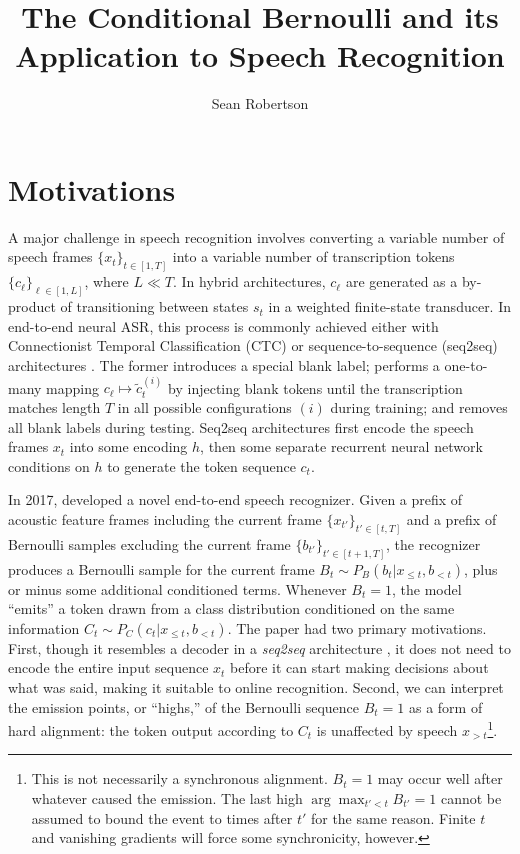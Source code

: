\documentclass{article}
\title{The Conditional Bernoulli and its Application to Speech Recognition}
\author{Sean Robertson}
\begin{document}
\maketitle

\section{Motivations} \label{sec:motivations}

A major challenge in speech recognition involves converting a variable number
of speech frames $\{x_t\}_{t \in [1, T]}$ into a variable number of
transcription tokens $\{c_\ell\}_{\ell \in [1, L]}$, where $L \ll T$. In hybrid
architectures, $c_\ell$ are generated as a by-product of transitioning between
states $s_t$ in a weighted finite-state transducer. In end-to-end neural ASR,
this process is commonly achieved either with Connectionist Temporal
Classification (CTC) \cite{gravesConnectionistTemporalClassification2006} or
sequence-to-sequence (seq2seq) architectures
\cite{bahdanauNeuralMachineTranslation2015}. The former introduces a special
blank label; performs a one-to-many mapping $c_\ell \mapsto \tilde{c}_t^{(i)}$
by injecting blank tokens until the transcription matches length $T$ in all
possible configurations $(i)$ during training; and removes all blank labels
during testing. Seq2seq architectures first encode the speech frames $x_t$ into
some encoding $h$, then some separate recurrent neural network conditions on
$h$ to generate the token sequence $c_t$.

In 2017, \citeauthor{luoLearningOnlineAlignments2017} developed a novel
end-to-end speech recognizer. Given a prefix of acoustic feature frames
including the current frame $\{x_{t'}\}_{t' \in [t, T]}$ and a prefix of
Bernoulli samples excluding the current frame $\{b_{t'}\}_{t' \in [t+1,T]}$,
the recognizer produces a Bernoulli sample for the current frame $B_t \sim
P_B(b_t|x_{\leq t}, b_{<t})$, plus or minus some additional conditioned terms.
Whenever $B_t = 1$, the model ``emits'' a token drawn from a class distribution
conditioned on the same information $C_t \sim P_C(c_t|x_{\leq t}, b_{<t})$. The
paper had two primary motivations. First, though it resembles a decoder in a
\textit{seq2seq} architecture \cite{bahdanauNeuralMachineTranslation2015}, it
does not need to encode the entire input sequence $x_t$ before it can start
making decisions about what was said, making it suitable to online recognition.
Second, we can interpret the emission points, or ``highs,'' of the Bernoulli
sequence $B_t = 1$ as a form of hard alignment: the token output according to
$C_t$ is unaffected by speech $x_{>t}$\footnote{
%
    This is not necessarily a synchronous alignment. $B_t = 1$ may occur well
    after whatever caused the emission. The last high $\arg\max_{t' < t} B_{t'}
    = 1$ cannot be assumed to bound the event to times after $t'$ for the same
    reason. Finite $t$ and vanishing gradients will force some synchronicity,
    however.
%
}.
\end{document}

